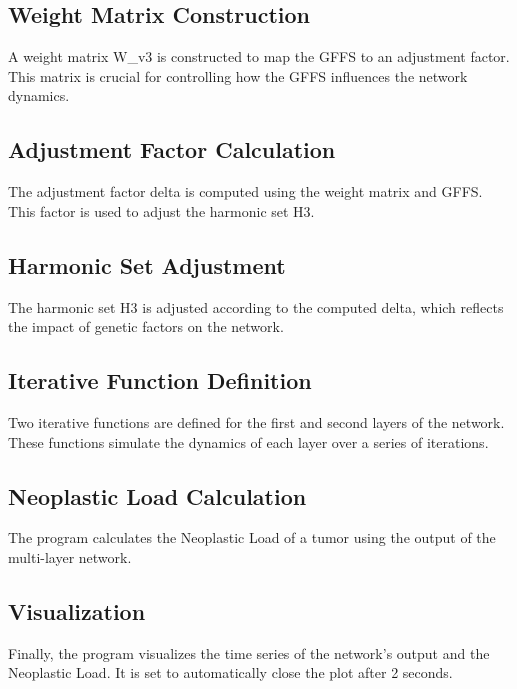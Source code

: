 \documentclass{article}
\begin{document}
\subsection{Weight Matrix Construction}

A weight matrix W\_v3 is constructed to map the GFFS to an adjustment factor. This matrix is crucial for controlling how the GFFS influences the network dynamics.

\subsection{Adjustment Factor Calculation}

The adjustment factor delta is computed using the weight matrix and GFFS. This factor is used to adjust the harmonic set H3.

\subsection{Harmonic Set Adjustment}

The harmonic set H3 is adjusted according to the computed delta, which reflects the impact of genetic factors on the network.

\subsection{Iterative Function Definition}

Two iterative functions are defined for the first and second layers of the network. These functions simulate the dynamics of each layer over a series of iterations.

\subsection{Neoplastic Load Calculation}

The program calculates the Neoplastic Load of a tumor using the output of the multi-layer network.

\subsection{Visualization}

Finally, the program visualizes the time series of the network's output and the Neoplastic Load. It is set to automatically close the plot after 2 seconds.
\end{document}
